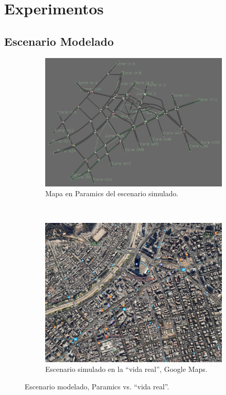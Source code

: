 \section{Experimentos}\label{sec:experiments}
\subsection{Escenario Modelado}

\begin{figure}[tpb]
    \centering
    \begin{subfigure}{0.8\textwidth}
        \centering
        \includegraphics[width=\linewidth]{figuras/costanera.png}
        \caption{Mapa en Paramics del escenario simulado.}
    \end{subfigure}\\
    \begin{subfigure}{0.8\textwidth}
        \centering
        \includegraphics[width=\linewidth]{figuras/costanera_maps.png}
        \caption{Escenario simulado en la ``vida real'', Google Maps.}
    \end{subfigure}
    \caption{Escenario modelado, Paramics vs. ``vida real''.}
    \label{fig:costanera}
\end{figure}


